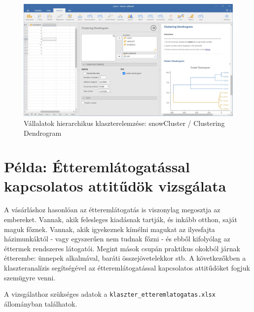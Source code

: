 \documentclass[
  letterpaper,
]{krantz}
\begin{document}
\begin{figure}

{\centering \includegraphics{./images/klaszter_vallalat_02.jpg}

}

\caption{Vállalatok hierarchikus klaszterelemzése: snowCluster /
Clustering Dendrogram}

\end{figure}

\hypertarget{puxe9lda-uxe9tteremluxe1togatuxe1ssal-kapcsolatos-attitux171duxf6k-vizsguxe1lata}{%
\section{Példa: Étteremlátogatással kapcsolatos attitűdök
vizsgálata}\label{puxe9lda-uxe9tteremluxe1togatuxe1ssal-kapcsolatos-attitux171duxf6k-vizsguxe1lata}}

A vásárláshoz hasonlóan az étteremlátogatás is viszonylag megosztja az
embereket. Vannak, akik felesleges kiadásnak tartják, és inkább otthon,
saját maguk főznek. Vannak, akik igyekeznek kímélni magukat az
ilyesfajta házimunkáktól - vagy egyszerűen nem tudnak főzni - és ebből
kifolyólag az éttermek rendszeres látogatói. Megint mások csupán
praktikus okokból járnak étterembe: ünnepek alkalmával, baráti
összejövetelekkor stb. A következőkben a klaszteranalízis segítségével
az étteremlátogatással kapcsolatos attitűdöket fogjuk szemügyre venni.

A vizsgálathoz szükséges adatok a
\texttt{klaszter\_etteremlatogatas.xlsx} állományban találhatok.
\end{document}
